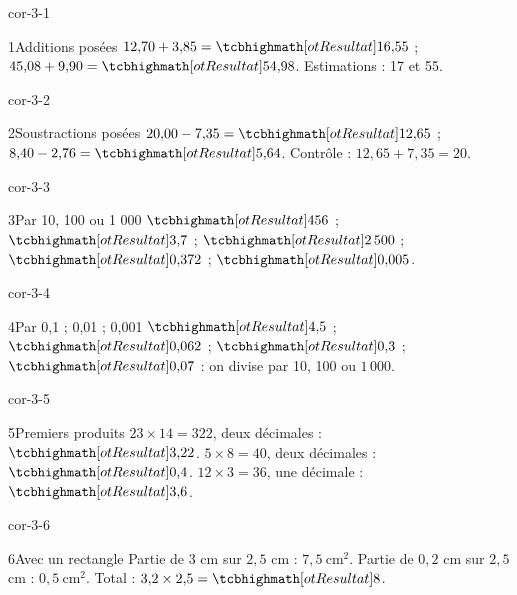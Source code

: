 \clearpage\pagestyle{otMain}\setlength{\otBlocEspacement}{2.5mm}\fontsize{11}{15}\selectfont{}
\begin{blocLivre}{cor-3-1}\begin{corrige}{1}{Additions posées}
$12{,}70+3{,}85=\res{16{,}55}$ ; $45{,}08+9{,}90=\res{54{,}98}$. Estimations : 17 et 55.
\end{corrige}\end{blocLivre}
\begin{blocLivre}{cor-3-2}\begin{corrige}{2}{Soustractions posées}
$20{,}00-7{,}35=\res{12{,}65}$ ; $8{,}40-2{,}76=\res{5{,}64}$. Contrôle : $12{,}65+7{,}35=20$.
\end{corrige}\end{blocLivre}
\begin{blocLivre}{cor-3-3}\begin{corrige}{3}{Par 10, 100 ou 1 000}
$\res{456}$ ; $\res{3{,}7}$ ; $\res{2\,500}$ ; $\res{0{,}372}$ ; $\res{0{,}005}$.
\end{corrige}\end{blocLivre}
\begin{blocLivre}{cor-3-4}\begin{corrige}{4}{Par 0,1 ; 0,01 ; 0,001}
$\res{4{,}5}$ ; $\res{0{,}062}$ ; $\res{0{,}3}$ ; $\res{0{,}07}$ : on divise par 10, 100 ou $1\,000$.
\end{corrige}\end{blocLivre}
\begin{blocLivre}{cor-3-5}\begin{corrige}{5}{Premiers produits}
$23\times14=322$, deux décimales : $\res{3{,}22}$. $5\times8=40$, deux décimales : $\res{0{,}4}$. $12\times3=36$, une décimale : $\res{3{,}6}$.
\end{corrige}\end{blocLivre}
\begin{blocLivre}{cor-3-6}\begin{corrige}{6}{Avec un rectangle}
Partie de 3 cm sur $2{,}5$ cm : $7{,}5\ \mathrm{cm}^2$. Partie de $0{,}2$ cm sur $2{,}5$ cm : $0{,}5\ \mathrm{cm}^2$. Total : $3{,}2\times2{,}5=\res{8}$.
\label{fig-cor-3-6}
\end{corrige}\end{blocLivre}
